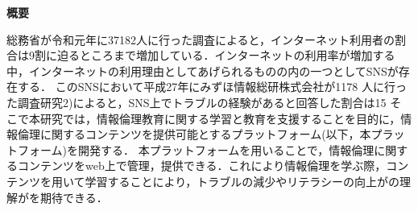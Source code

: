 \begin{center}
{\bf \Large 概要}
\end{center} 
総務省が令和元年に37182人に行った調査によると，インターネット利用者の割合は9割に迫るところまで増加している\cite{soumu}．インターネットの利用率が増加する中，インターネットの利用理由としてあげられるものの内の一つとしてSNSが存在する．
このSNSにおいて平成27年にみずほ情報総研株式会社が1178 人に行った調査研究2)によると，SNS上でトラブルの経験があると回答した割合は15%
そこで本研究では，情報倫理教育に関する学習と教育を支援することを目的に，情報倫理に関するコンテンツを提供可能とするプラットフォーム(以下，本プラットフォーム)を開発する．
本プラットフォームを用いることで，情報倫理に関するコンテンツをweb上で管理，提供できる．これにより情報倫理を学ぶ際，コンテンツを用いて学習することにより，トラブルの減少やリテラシーの向上がの理解がを期待できる．
